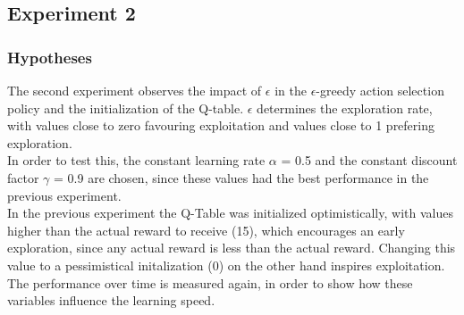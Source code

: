 \documentclass[11pt]{article}
\begin{document}
\subsubsection{}



\subsection{Experiment 2}

\subsubsection{Hypotheses}
The second experiment observes the impact of $\epsilon$ in the $\epsilon$-greedy action selection policy and the initialization of the Q-table. $\epsilon$ determines the exploration rate, with values close to zero favouring exploitation and values close to 1 prefering exploration.\\
In order to test this, the constant learning rate $\alpha$ = 0.5 and the constant discount factor $\gamma$ = 0.9 are chosen, since these values had the best performance in the previous experiment.\\
In the previous experiment the Q-Table was initialized optimistically, with values higher than the actual reward to receive (15), which encourages an early exploration, since any actual reward is less than the actual reward. Changing this value to a pessimistical initalization (0) on the other hand inspires exploitation.\\
The performance over time is measured again, in order to show how these variables influence the learning speed.
\end{document}

